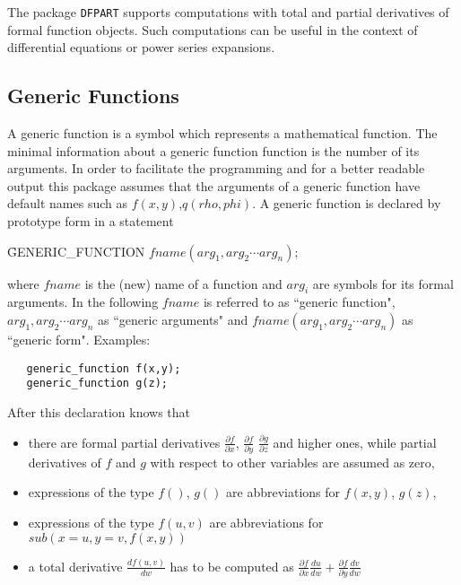 
The package {\tt DFPART} supports computations with total and partial
derivatives of formal function objects. Such computations can
be useful in the context of differential equations or
power series expansions.

\subsection{Generic Functions}

A generic function is a symbol which represents a mathematical
function. The minimal information about a generic function 
function is the number of its arguments. In order to facilitate
the programming and for a better readable output this package
assumes that the arguments of a generic function have default
names such as $f(x,y)$,$q(rho,phi)$. 
A generic function is declared by prototype form in a statement

\vspace{.1in}
 \f{GENERIC\_FUNCTION} $fname(arg_1,arg_2\cdots arg_n)$;
\vspace{.1in}

\noindent
where $fname$ is the (new) name of a function and $arg_i$ are
symbols for its formal arguments. 
In the following $fname$ is referred to as ``generic function",
$arg_1,arg_2\cdots arg_n$ as ``generic arguments" and
$fname(arg_1,arg_2\cdots arg_n)$ as ``generic form".
Examples:

\begin{verbatim}
   generic_function f(x,y);
   generic_function g(z);
\end{verbatim}


After this declaration {\REDUCE} knows that 
\begin{itemize}
\item there are formal partial derivatives $\frac{\partial f}{\partial x}$,
$\frac{\partial f}{\partial y}$ $\frac{\partial g}{\partial z}$
and higher ones, while partial derivatives of $f$ and $g$
with respect to other variables are assumed as zero,
\item expressions of the type $f()$, $g()$ are abbreviations for
$f(x,y)$, $g(z)$,
\item expressions of the type $f(u,v)$ are abbreviations for\\
$sub(x=u,y=v,f(x,y))$
\item a total derivative $\frac{d f(u,v)}{d w}$ has to be computed
as $\frac{\partial f}{\partial x} \frac{d u}{d w} +
    \frac{\partial f}{\partial y} \frac{d v}{d w}$
\end{itemize}

